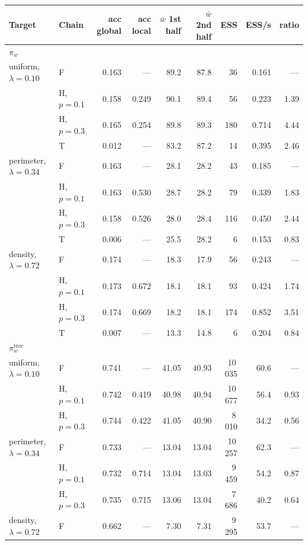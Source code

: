 \documentclass[11pt]{article}
\begin{document}
\begin{table}[htbp]
\centering
\small
\begin{tabular}{llrrrrrrr}
\toprule
Target & Chain & acc global & acc local & $\bar w$ 1st half & $\bar w$ 2nd half & ESS & ESS/s & ratio \\
\midrule
\multicolumn{9}{l}{$\pi_w$} \\
uniform, $\lambda{=}0.10$ & F & 0.163 & --- & 89.2 & 87.8 & 36 & 0.161 & --- \\
 & H, $p{=}0.1$ & 0.158 & 0.249 & 90.1 & 89.4 & 56 & 0.223 & 1.39 \\
 & H, $p{=}0.3$ & 0.165 & 0.254 & 89.8 & 89.3 & 180 & 0.714 & 4.44 \\
 & T & 0.012 & --- & 83.2 & 87.2 & 14 & 0.395 & 2.46 \\
perimeter, $\lambda{=}0.34$ & F & 0.163 & --- & 28.1 & 28.2 & 43 & 0.185 & --- \\
 & H, $p{=}0.1$ & 0.163 & 0.530 & 28.7 & 28.2 & 79 & 0.339 & 1.83 \\
 & H, $p{=}0.3$ & 0.158 & 0.526 & 28.0 & 28.4 & 116 & 0.450 & 2.44 \\
 & T & 0.006 & --- & 25.5 & 28.2 & 6 & 0.153 & 0.83 \\
density, $\lambda{=}0.72$ & F & 0.174 & --- & 18.3 & 17.9 & 56 & 0.243 & --- \\
 & H, $p{=}0.1$ & 0.173 & 0.672 & 18.1 & 18.1 & 93 & 0.424 & 1.74 \\
 & H, $p{=}0.3$ & 0.174 & 0.669 & 18.2 & 18.1 & 174 & 0.852 & 3.51 \\
 & T & 0.007 & --- & 13.3 & 14.8 & 6 & 0.204 & 0.84 \\
\midrule
\multicolumn{9}{l}{$\pi_w^{\mathrm{tree}}$} \\
uniform, $\lambda{=}0.10$ & F & 0.741 & --- & 41.05 & 40.93 & 10\,035 & 60.6 & --- \\
 & H, $p{=}0.1$ & 0.742 & 0.419 & 40.98 & 40.94 & 10\,677 & 56.4 & 0.93 \\
 & H, $p{=}0.3$ & 0.744 & 0.422 & 41.05 & 40.90 & 8\,010 & 34.2 & 0.56 \\
perimeter, $\lambda{=}0.34$ & F & 0.733 & --- & 13.04 & 13.04 & 10\,257 & 62.3 & --- \\
 & H, $p{=}0.1$ & 0.732 & 0.714 & 13.04 & 13.03 & 9\,459 & 54.2 & 0.87 \\
 & H, $p{=}0.3$ & 0.735 & 0.715 & 13.06 & 13.04 & 7\,686 & 40.2 & 0.64 \\
density, $\lambda{=}0.72$ & F & 0.662 & --- & 7.30 & 7.31 & 9\,295 & 53.7 & --- \\

\end{tabular}
\end{table}
\end{document}
